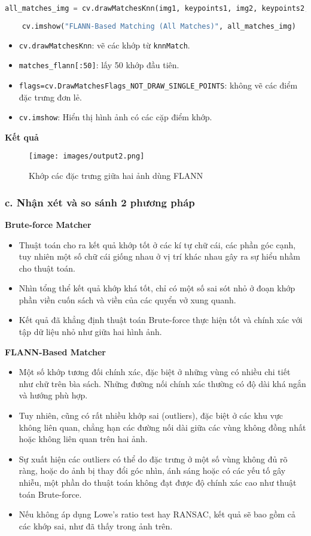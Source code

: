 \begin{lstlisting}[language=Python]
    all_matches_img = cv.drawMatchesKnn(img1, keypoints1, img2, keypoints2, matches_flann[:50], None, flags=cv.DrawMatchesFlags_NOT_DRAW_SINGLE_POINTS)
    
	cv.imshow("FLANN-Based Matching (All Matches)", all_matches_img)
\end{lstlisting}

\begin{itemize}
	\item \texttt{cv.drawMatchesKnn}: vẽ các khớp từ \texttt{knnMatch}.
	\item \texttt{matches\_flann[:50]}: lấy 50 khớp đầu tiên.
	\item \texttt{flags=cv.DrawMatchesFlags\_NOT\_DRAW\_SINGLE\_POINTS}: không vẽ các điểm đặc trưng đơn lẻ.
	
	\item \texttt{cv.imshow}: Hiển thị hình ảnh có các cặp điểm khớp.
\end{itemize}

\textbf{Kết quả}

\begin{figure}[H]
	\centering
	\texttt{[image: images/output2.png]}
	\caption{Khớp các đặc trưng giữa hai ảnh dùng FLANN}
\end{figure}


\subsubsection*{c. Nhận xét và so sánh 2 phương pháp}
\textbf{Brute-force Matcher}
\begin{itemize}
	\item Thuật toán cho ra kết quả khớp tốt ở các kí tự chữ cái, các phần góc cạnh, tuy nhiên một số chữ cái giống nhau ở vị trí khác nhau gây ra sự hiểu nhầm cho thuật toán.
	\item Nhìn tổng thể kết quả khớp khá tốt, chỉ có một số sai sót nhỏ ở đoạn khớp phần viền cuốn sách và viền của các quyển vở xung quanh.
	\item Kết quả đã khẳng định thuật toán Brute-force thực hiện tốt và chính xác với tập dữ liệu nhỏ như giữa hai hình ảnh.
\end{itemize}
\textbf{FLANN-Based Matcher}
\begin{itemize}
	\item Một số khớp tương đối chính xác, đặc biệt ở những vùng có nhiều chi tiết như chữ trên bìa sách. Những đường nối chính xác thường có độ dài khá ngắn và hướng phù hợp.
	\item Tuy nhiên, cũng có rất nhiều khớp sai (outliers), đặc biệt ở các khu vực không liên quan, chẳng hạn các đường nối dài giữa các vùng không đồng nhất hoặc không liên quan trên hai ảnh.
	\item Sự xuất hiện các outliers có thể do đặc trưng ở một số vùng không đủ rõ ràng, hoặc do ảnh bị thay đổi góc nhìn, ánh sáng hoặc có các yếu tố gây nhiễu, một phần do thuật toán không đạt được độ chính xác cao như thuật toán Brute-force.
	\item Nếu không áp dụng Lowe's ratio test hay RANSAC, kết quả sẽ bao gồm cả các khớp sai, như đã thấy trong ảnh trên.
\end{itemize}

